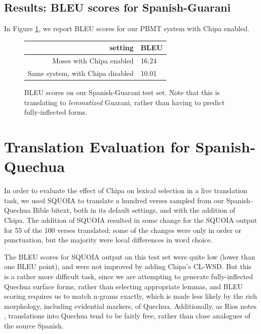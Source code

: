 
\subsection{Results: BLEU scores for Spanish-Guarani}

In Figure \ref{fig:bleu-es-gn}, we report BLEU scores for our PBMT system with
Chipa enabled.

\begin{figure}
  \begin{centering}
  \begin{tabulary}{\textwidth}{|R|L|}
    \hline
    setting & BLEU \\
    \hline
    Moses with Chipa enabled &  16.24 \\
    \hline
    Same system, with Chipa disabled &  10.01 \\
    \hline
  \end{tabulary}
  \end{centering}
  \caption{BLEU scores on our Spanish-Guarani test set. Note that this is
  translating to \emph{lemmatized} Guarani, rather than having to predict
  fully-inflected forms.}
  \label{fig:bleu-es-gn}
\end{figure}


\section{Translation Evaluation for Spanish-Quechua}

In order to evaluate the effect of Chipa on lexical selection in a live
translation task, we used SQUOIA to translate a hundred verses sampled from our
Spanish-Quechua Bible bitext, both in its default settings, and with the
addition of Chipa. The addition of SQUOIA resulted in some change for the
SQUOIA output for 55 of the 100 verses translated; some of the changes were
only in order or punctuation, but the majority were local differences in word
choice.

The BLEU scores for SQUOIA output on this test set were quite low (lower than
one BLEU point), and were not improved by adding Chipa's CL-WSD. But this is a
rather more difficult task, since we are attempting to generate fully-inflected
Quechua surface forms, rather than selecting appropriate lemmas, and BLEU
scoring requires us to match n-grams exactly, which is made less likely by the
rich morphology, including evidential markers, of Quechua. Additionally, as
Rios notes \cite[\S 5.9]{rios2015basic}, translations into Quechua tend to be
fairly free, rather than close analogues of the source Spanish.

